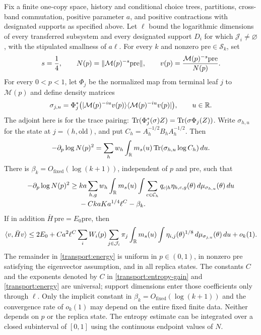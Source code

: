 \begin{proposition}\label{prop:transport}
Fix a finite one-copy space, history and conditional choice trees,
partitions, cross-band commutation, positive parameter $a$, and positive
contractions with designated supports as specified above.  Let $\ell$
bound the logarithmic dimensions of every transferred subsystem and
every designated support $D_i$ for which $\mathcal J_i\ne\varnothing$,
with the stipulated smallness of $a\ell$.
For every $k$ and nonzero $\mathrm{pre}\in\mathcal S_k$, set
\begin{equation}\label{transport:filtered-vector}
 s=\frac14,\qquad
 N(p)=\lVert \mathcal M(p)^{-s}\mathrm{pre}\rVert,\qquad
 v(p)=\frac{\mathcal M(p)^{-s}\mathrm{pre}}{N(p)}.
\end{equation}
For every $0<p<1$, let $\Phi_j$ be the normalized map from terminal
leaf $j$ to $\mathcal M(p)$ and define density matrices
\begin{equation}\label{transport:states}
 \sigma_{j,u}=\Phi_j^*\bigl(
 |\mathcal M(p)^{-iu}v(p)\rangle
 \langle\mathcal M(p)^{-iu}v(p)|\bigr),\qquad u\in\mathbb R.
\end{equation}
The adjoint here is for the trace pairing:
$\operatorname{Tr}(\Phi_j^*(\sigma)Z)=\operatorname{Tr}(\sigma\Phi_j(Z))$.
Write $\sigma_{h,u}$ for the state at $j=(h,\mathrm{old})$, and put
$C_h=A_h^{-1/2}B_hA_h^{-1/2}$.  Then
\begin{equation}\label{transport:exact-derivative}
 -\partial_p\log N(p)^2
 =\sum_h w_h\int_{\mathbb R}m_s(u)\operatorname{Tr}(\sigma_{h,u}\log C_h)\,du.
\end{equation}
There is $\beta_k=O_{\mathrm{fixed}}(\log(k+1))$, independent of $p$
and $\mathrm{pre}$, such that
\begin{align}\label{transport:entropy-gain}
 -\partial_p\log N(p)^2
 \geq{}&ka\sum_{h,g}w_h\int_{\mathbb R}m_s(u)
    \int\sum_{c\in\mathcal C_h}q_{c\mid h}
          \eta_{h,c,g}(\theta)\,d\mu_{\sigma_{h,u}}(\theta)\,du
 \notag\\[-2pt]
 &{}-CkaK a^{1/4}\ell^C-\beta_k.
\end{align}
If in addition $\bar H\,\mathrm{pre}=E_0\mathrm{pre}$, then
\begin{equation}\label{transport:energy}
 \langle v,\bar Hv\rangle
 \leq 2E_0+C a^2\ell^C
 \sum_i W_i(p)\sum_{j\in\mathcal J_i}\pi_j
 \int_{\mathbb R}m_s(u)\int\eta_{i,j}(\theta)^{1/8}
                 \,d\mu_{\sigma_{j,u}}(\theta)\,du+o_k(1).
\end{equation}
The remainder in \eqref{transport:energy} is uniform in $p\in(0,1)$,
in nonzero $\mathrm{pre}$ satisfying the eigenvector assumption, and in
all replica states.  The constants $C$ and the exponents denoted by $C$
in \eqref{transport:entropy-gain} and \eqref{transport:energy} are
universal; support dimensions enter those coefficients only through
$\ell$.  Only the implicit constant in
$\beta_k=O_{\mathrm{fixed}}(\log(k+1))$ and the convergence rate of
$o_k(1)$ may depend on the entire fixed finite data.  Neither depends
on $p$ or the replica state.  The entropy estimate can be integrated
over a closed subinterval
of $[0,1]$ using the continuous endpoint values of $N$.
\end{proposition}

